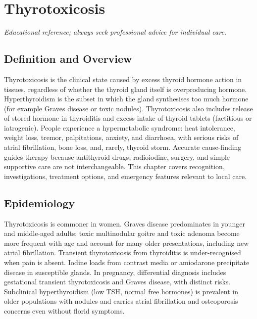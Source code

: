 \chapter{Thyrotoxicosis}

\medskip
\noindent\textit{Educational reference; always seek professional advice for individual care.}

\section*{Definition and Overview}
Thyrotoxicosis is the clinical state caused by excess thyroid hormone action in tissues, regardless of whether the thyroid gland itself is overproducing hormone. Hyperthyroidism is the subset in which the gland synthesises too much hormone (for example Graves disease or toxic nodules). Thyrotoxicosis also includes release of stored hormone in thyroiditis and excess intake of thyroid tablets (factitious or iatrogenic). People experience a hypermetabolic syndrome: heat intolerance, weight loss, tremor, palpitations, anxiety, and diarrhoea, with serious risks of atrial fibrillation, bone loss, and, rarely, thyroid storm. Accurate cause-finding guides therapy because antithyroid drugs, radioiodine, surgery, and simple supportive care are not interchangeable. This chapter covers recognition, investigations, treatment options, and emergency features relevant to local care.

\section*{Epidemiology}
Thyrotoxicosis is commoner in women. Graves disease predominates in younger and middle-aged adults; toxic multinodular goitre and toxic adenoma become more frequent with age and account for many older presentations, including new atrial fibrillation. Transient thyrotoxicosis from thyroiditis is under-recognised when pain is absent. Iodine loads from contrast media or amiodarone precipitate disease in susceptible glands. In pregnancy, differential diagnosis includes gestational transient thyrotoxicosis and Graves disease, with distinct risks. Subclinical hyperthyroidism (low TSH, normal free hormones) is prevalent in older populations with nodules and carries atrial fibrillation and osteoporosis concerns even without florid symptoms.

